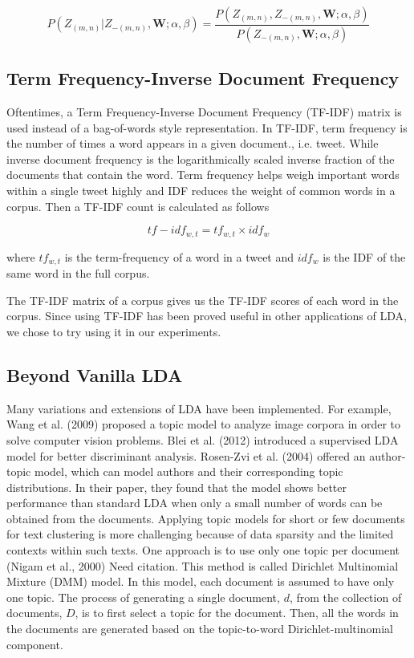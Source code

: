 \documentclass[12pt]{amsart}
\newcommand{\0}{\mat{0}}
\newcommand{\1}{\mathds{1}}
\begin{document}
$$ P( Z_{(m,n)} | Z_{-(m,n)}, \pmb{W}; \alpha, \beta) = \frac{P(Z_{(m,n)}, Z_{-(m,n)}, \pmb{W}; \alpha, \beta)}{P(Z_{-(m,n)}, \pmb{W}; \alpha, \beta)} $$

\subsection{Term Frequency-Inverse Document Frequency}
Oftentimes, a Term Frequency-Inverse Document Frequency (TF-IDF) matrix is used instead of a bag-of-words style representation. In TF-IDF, term frequency is the number of times a word appears in a given document., i.e. tweet. While inverse document frequency is the logarithmically scaled inverse fraction of the documents that contain the word. Term frequency helps weigh important words within a single tweet highly and IDF reduces the weight of common words in a corpus. Then a TF-IDF count is calculated as follows

$$ tf-idf_{w,t} = tf_{w,t} \times idf_{w}  $$

where $tf_{w,t}$ is the term-frequency of a word in a tweet and $idf_w$ is the IDF of the same word in the full corpus.

The TF-IDF matrix of a corpus gives us the TF-IDF scores of each word in the corpus. Since using TF-IDF has been proved useful in other applications of LDA, we chose to try using it in our experiments. 

\subsection{Beyond Vanilla LDA}
Many variations and extensions of LDA have been implemented. For example, Wang et al. (2009) proposed a topic model to analyze image corpora in order to solve computer vision problems. Blei et al. (2012) introduced a supervised LDA model for better discriminant analysis. Rosen-Zvi et al. (2004) offered an author-topic model, which can model authors and their corresponding topic distributions. In their paper, they found that the model shows better performance than standard LDA when only a small number of words can be obtained from the documents. Applying topic models for short or few documents for text clustering is more challenging because of data sparsity and the limited contexts within such texts. One approach is to use only one topic per document (Nigam et al., 2000) {\Huge Need citation}. This method is called Dirichlet Multinomial Mixture (DMM) model. In this model, each document is assumed to have only one topic. The process of generating a single document, $d$, from the collection of documents, $D$, is to first select a topic for the document. Then, all the words in the documents are generated based on the topic-to-word Dirichlet-multinomial component.
\end{document}
